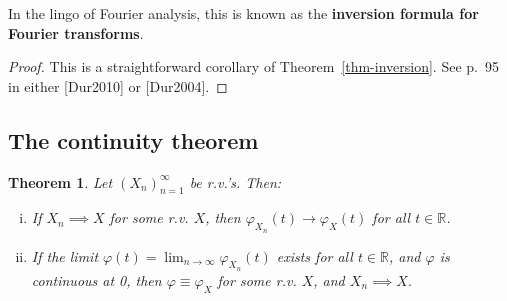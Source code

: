 \documentclass[12pt]{article}
\newtheorem{thm}{Theorem}[section]
\newcommand{\R}{\mathbb{R}}
\theoremstyle{example}
\begin{document}
In the lingo of Fourier analysis, this is known as the \textbf{inversion formula for Fourier transforms}.

\begin{proof} This is a straightforward corollary of Theorem~\ref{thm-inversion}. See p.~95 in either [Dur2010] or [Dur2004].
\end{proof}

\subsection{The continuity theorem}

\begin{thm} 
\label{thm-continuity}
Let $(X_n)_{n=1}^\infty$ be r.v.'s. Then:
\begin{enumerate}[(i)]
\item If $X_n \implies X$ for some r.v. $X$, then $\varphi_{X_n}(t)\to \varphi_X(t)$ for all $t\in\R$.
\item If the limit $\varphi(t) = \lim_{n\to\infty} \varphi_{X_n}(t)$ exists for all $t\in\R$, and $\varphi$ is continuous at 0, then $\varphi\equiv \varphi_X$ for some r.v. $X$, and $X_n \implies X$.
\end{enumerate}
\end{thm}
\end{document}
